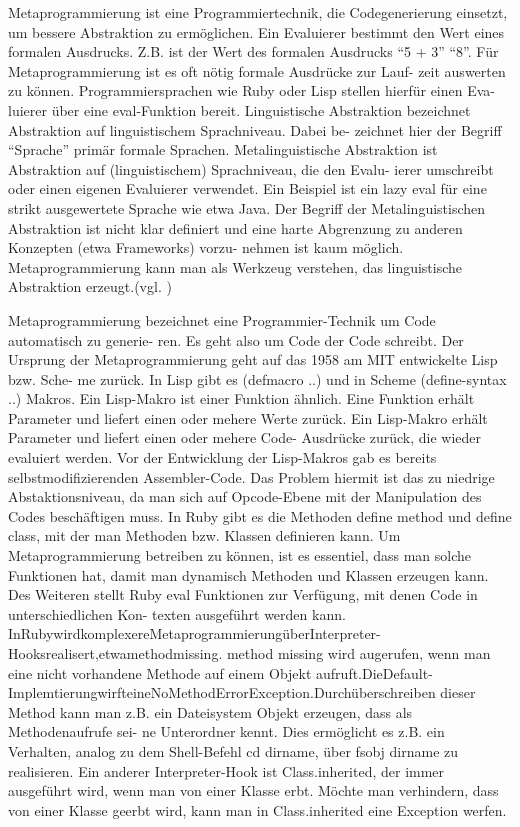 \documentclass[11pt,english,ngerman, headsepline]{scrreprt}
\begin{document}
Metaprogrammierung ist eine Programmiertechnik, die Codegenerierung einsetzt, um
bessere Abstraktion zu ermöglichen.
Ein Evaluierer bestimmt den Wert eines formalen Ausdrucks. Z.B. ist der Wert des
formalen Ausdrucks “5 + 3” “8”. Für Metaprogrammierung ist es oft nötig
formale Ausdrücke zur Lauf- zeit auswerten zu können. Programmiersprachen wie
Ruby oder Lisp stellen hierfür einen Eva- luierer über eine eval-Funktion
bereit.
Linguistische Abstraktion bezeichnet Abstraktion auf linguistischem
Sprachniveau. Dabei be- zeichnet hier der Begriff “Sprache” primär formale
Sprachen.
Metalinguistische Abstraktion ist Abstraktion auf (linguistischem) Sprachniveau,
die den Evalu- ierer umschreibt oder einen eigenen Evaluierer verwendet. Ein
Beispiel ist ein lazy eval für eine strikt ausgewertete Sprache wie etwa Java.
Der Begriff der Metalinguistischen Abstraktion ist nicht klar definiert und eine
harte Abgrenzung zu anderen Konzepten (etwa Frameworks) vorzu- nehmen ist kaum
möglich.
Metaprogrammierung kann man als Werkzeug verstehen, das linguistische
Abstraktion erzeugt.(vgl. \cite{biekermetaprogrammierung})

Metaprogrammierung bezeichnet eine Programmier-Technik um Code automatisch zu
generie- ren. Es geht also um Code der Code schreibt.
Der Ursprung der Metaprogrammierung geht auf das 1958 am MIT entwickelte Lisp
bzw. Sche- me zurück. In Lisp gibt es (defmacro ..) und in Scheme (define-syntax
..) Makros. Ein Lisp-Makro ist einer Funktion ähnlich. Eine Funktion erhält
Parameter und liefert einen oder mehere Werte zurück. Ein Lisp-Makro erhält
Parameter und liefert einen oder mehere Code- Ausdrücke zurück, die wieder
evaluiert werden.
Vor der Entwicklung der Lisp-Makros gab es bereits selbstmodifizierenden
Assembler-Code. Das Problem hiermit ist das zu niedrige Abstaktionsniveau, da
man sich auf Opcode-Ebene mit der Manipulation des Codes beschäftigen muss.
In Ruby gibt es die Methoden define method und define class, mit der man
Methoden bzw. Klassen definieren kann. Um Metaprogrammierung betreiben zu
können, ist es essentiel, dass man solche Funktionen hat, damit man dynamisch
Methoden und Klassen erzeugen kann. Des Weiteren stellt Ruby eval Funktionen zur
Verfügung, mit denen Code in unterschiedlichen Kon- texten ausgeführt werden
kann.
InRubywirdkomplexereMetaprogrammierungüberInterpreter-Hooksrealisert,etwamethodmissing.
method missing wird augerufen, wenn man eine nicht vorhandene Methode auf einem
Objekt
aufruft.DieDefault-ImplemtierungwirfteineNoMethodErrorException.Durchüberschreiben
dieser Method kann man z.B. ein Dateisystem Objekt erzeugen, dass als
Methodenaufrufe sei- ne Unterordner kennt. Dies ermöglicht es z.B. ein
Verhalten, analog zu dem Shell-Befehl cd dirname, über fsobj dirname zu
realisieren.
Ein anderer Interpreter-Hook ist Class.inherited, der immer ausgeführt wird,
wenn man von einer Klasse erbt. Möchte man verhindern, dass von einer Klasse
geerbt wird, kann man in Class.inherited eine Exception werfen.
\end{document}
